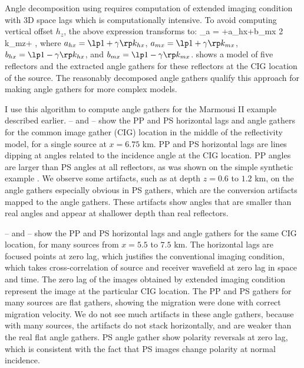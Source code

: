Angle decomposition using  requires computation of extended imaging condition with 3D space lags which is computationally intensive.
To avoid computing vertical offset $h_z$, the above expression transforms to:
\def\ahx{a_{hx}}
\def\bmx{b_{mx}}
\def\amx{a_{mx}}
\def\bhx{b_{hx}}
\def\kmx{k_{mx}}
\def\khx{k_{hx}}
\def\kmz{k_{mz}}
\def\khz{k_{hz}}
\beq
\tan\theta_a = \frac
{ +\gamma\rp \lp\ahx+\bmx\rp }
{ 2\gamma\; \kmz+\sqrt{4\gamma^2\kmz^2+\lp\gamma^2-1\rp \lp\ahx+\bmx\rp \lp\amx+\bhx\rp} } \; ,
\eeq
where 
$\ahx=\lp 1+\gamma\rp \khx$,
$\amx=\lp 1+\gamma\rp \kmx$,
$\bhx=\lp 1-\gamma\rp \khx$, and 
$\bmx=\lp 1-\gamma\rp \kmx$.
 shows a model of five reflectors and the extracted angle gathers for these reflectors at the CIG location of the source. The reasonably decomposed angle gathers qualify this approach for making angle gathers for more complex models.

I use this algorithm to compute angle gathers for the Marmousi II example described earlier. -- and -- show the PP and PS horizontal lags and angle gathers for the common image gather (CIG) location in the middle of the reflectivity model, for a single source at $x=6.75$ km. PP and PS horizontal lags are lines dipping at angles related to the incidence angle at the CIG location. PP angles are larger than PS angles at all reflectors, as was shown on the simple synthetic example . We observe some artifacts, such as at depth $z=0.6$ to $1.2$ km, on the angle gathers especially obvious in PS gathers, which are the conversion artifacts mapped to the angle gathers. These artifacts show angles that are smaller than real angles and appear at shallower depth than real reflectors.

-- and -- show the PP and PS horizontal lags and angle gathers for the same CIG location, for many sources from $x=5.5$ to $7.5$ km. 
The horizontal lags are focused points at zero lag, which justifies the conventional imaging condition, which takes cross-correlation of source and receiver wavefield at zero lag in space and time. The zero lag of the images obtained by extended imaging condition represent the image at the particular CIG location. The PP and PS gathers for many sources are flat gathers, showing the migration were done with correct migration velocity. We do not see much artifacts in these angle gathers, because with many sources, the artifacts do not stack horizontally, and are weaker than the real flat angle gathers. 
PS angle gather  show polarity reversals at zero lag, which is consistent with the fact that PS images change polarity at normal incidence.


